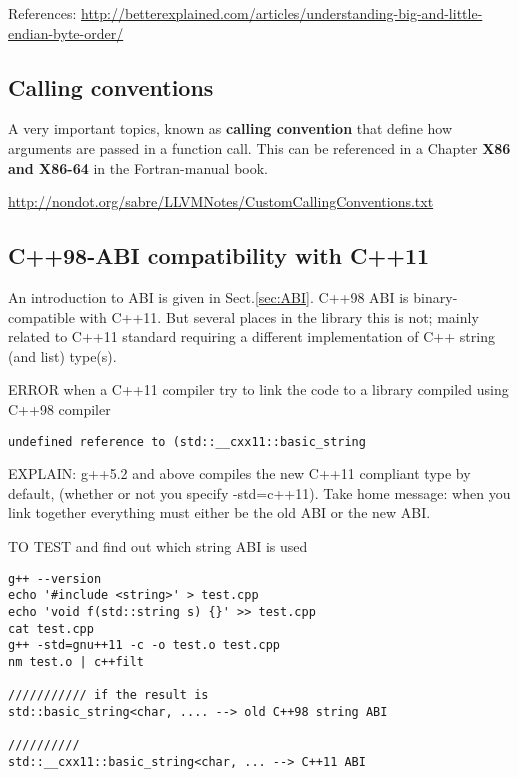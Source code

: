 References:
\url{http://betterexplained.com/articles/understanding-big-and-little-endian-byte-order/}

\subsection{Calling conventions}

A very important topics, known as {\bf calling convention} that define how
arguments are passed in a function call. This can be referenced in a Chapter
{\bf X86 and X86-64} in the Fortran-manual book.

\url{http://nondot.org/sabre/LLVMNotes/CustomCallingConventions.txt}


\subsection{C++98-ABI compatibility with C++11}
\label{sec:ABI-compatibility-C++98-C++11}

An introduction to ABI is given in Sect.\ref{sec:ABI}.
C++98 ABI is binary-compatible with C++11. But several places in the library
this is not; mainly related to C++11 standard requiring a different
implementation of C++ string (and list) type(s). 

ERROR when a C++11 compiler try to link the code to a library compiled using
C++98 compiler
\begin{verbatim}
undefined reference to (std::__cxx11::basic_string
\end{verbatim}

EXPLAIN: g++5.2 and above compiles the new C++11 compliant type by default,
(whether or not you specify -std=c++11).
Take home message: when you link together everything must either be the old ABI
or the new ABI.

TO TEST and find out which string ABI is used
\begin{verbatim}
g++ --version
echo '#include <string>' > test.cpp
echo 'void f(std::string s) {}' >> test.cpp
cat test.cpp
g++ -std=gnu++11 -c -o test.o test.cpp
nm test.o | c++filt

/////////// if the result is
std::basic_string<char, .... --> old C++98 string ABI

//////////
std::__cxx11::basic_string<char, ... --> C++11 ABI
\end{verbatim}

